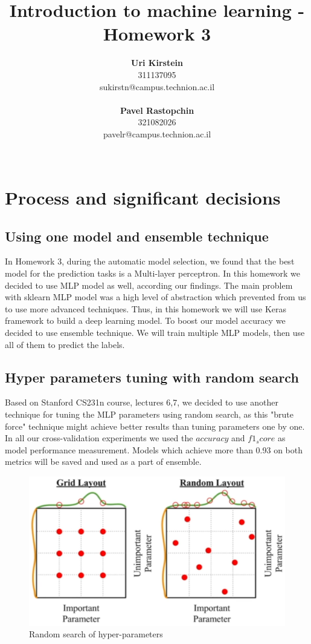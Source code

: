 \documentclass[12pt]{article}
\begin{document}
\title{\Huge Introduction to machine learning - Homework 3}

\author{
  \textbf{Uri Kirstein}\\
  311137095 \\ sukirstn@campus.technion.ac.il
  \\ \\
  \textbf{Pavel Rastopchin}\\
  321082026 \\ pavelr@campus.technion.ac.il
  \\ \\ 
}

\maketitle


\section{Process and significant decisions}
\subsection{Using one model and ensemble technique}
In Homework 3, during the automatic model selection, we found that the best model for the prediction tasks is a Multi-layer perceptron. In this homework we decided to use MLP model as well, according our findings. The main problem with sklearn MLP model was a high level of abstraction which prevented from us to use more advanced techniques. Thus, in this homework we will use Keras framework to build a deep learning model. To boost our model accuracy we decided to use ensemble technique. We will train multiple MLP models, then use all of them to predict the labels. 

\subsection{Hyper parameters tuning with random search}
Based on Stanford CS231n course, lectures 6,7, we decided to use another technique for tuning the MLP parameters using random search, as this "brute force" technique might achieve better results than tuning parameters one by one. In all our cross-validation experiments we used the $accuracy$ and $f1_score$ as model performance measurement. Models which achieve more than 0.93 on both metrics will be saved and used as a part of ensemble.

\begin{figure}[h]
\centering
\includegraphics[width=.6\linewidth]{pics/random_search}
\caption{Random search of hyper-parameters}
\end{figure}
\end{document}
